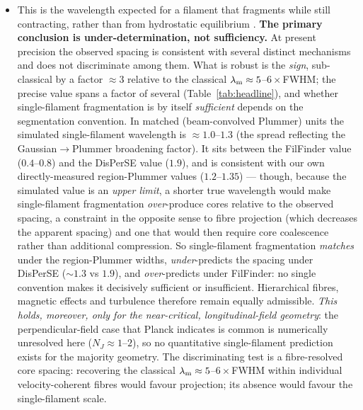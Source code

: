 \documentclass[usenatbib,twoside,twocolumn]{mnras}
\begin{document}
\begin{itemize}
\begin{itemize}
        \item This is the wavelength expected for a filament that fragments while still contracting, rather than from hydrostatic equilibrium \citep{Clarke2016}. \textbf{The primary conclusion is under-determination, not sufficiency.} At present precision the observed spacing is consistent with several distinct mechanisms and does not discriminate among them. What is robust is the \emph{sign}, sub-classical by a factor $\approx3$ relative to the classical $\lambda_{\rm m}\approx5$--$6\times$FWHM; the precise value spans a factor of several (Table~\ref{tab:headline}), and whether single-filament fragmentation is by itself \emph{sufficient} depends on the segmentation convention. In matched (beam-convolved Plummer) units the simulated single-filament wavelength is $\approx1.0$--$1.3$ (the spread reflecting the Gaussian$\to$Plummer broadening factor). It sits between the FilFinder value ($0.4$--$0.8$) and the DisPerSE value ($1.9$), and is consistent with our own directly-measured region-Plummer values ($1.2$--$1.35$) --- though, because the simulated value is an \emph{upper limit}, a shorter true wavelength would make single-filament fragmentation \emph{over}-produce cores relative to the observed spacing, a constraint in the opposite sense to fibre projection (which decreases the apparent spacing) and one that would then require core coalescence rather than additional compression. So single-filament fragmentation \emph{matches} under the region-Plummer widths, \emph{under}-predicts the spacing under DisPerSE ($\sim1.3$ vs $1.9$), and \emph{over}-predicts under FilFinder: no single convention makes it decisively sufficient or insufficient. Hierarchical fibres, magnetic effects and turbulence therefore remain equally admissible. \emph{This holds, moreover, only for the near-critical, longitudinal-field geometry}: the perpendicular-field case that Planck indicates is common is numerically unresolved here ($N_J\approx1$--$2$), so no quantitative single-filament prediction exists for the majority geometry. The discriminating test is a fibre-resolved core spacing: recovering the classical $\lambda_{\rm m}\approx5$--$6\times$FWHM within individual velocity-coherent fibres would favour projection; its absence would favour the single-filament scale.
    \end{itemize}


\end{itemize}
\end{document}
